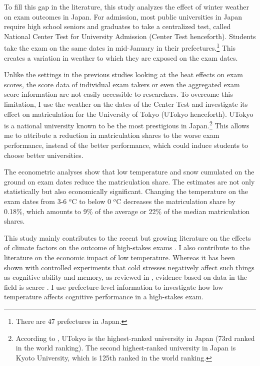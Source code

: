 \documentclass[12pt,letterpaper]{article}
\begin{document}
To fill this gap in the literature, this study analyzes the effect of winter weather on exam outcomes in Japan.
For admission, most public universities in Japan require high school seniors and graduates to take a centralized test, called National Center Test for University Admission (Center Test henceforth).
Students take the exam on the same dates in mid-January in their prefectures.\footnote{
  There are 47 prefectures in Japan.
}
This creates a variation in weather to which they are exposed on the exam dates.

Unlike the settings in the previous studies looking at the heat effects on exam scores, the score data of individual exam takers or even the aggregated exam score information are not easily accessible to researchers.
To overcome this limitation, I use the weather on the dates of the Center Test and investigate its effect on matriculation for the University of Tokyo (UTokyo henceforth).
UTokyo is a national university known to be the most prestigious in Japan.\footnote{
  According to \citet{usnews}, UTokyo is the highest-ranked university in Japan (73rd ranked in the world ranking).
  The second highest-ranked university in Japan is Kyoto University, which is 125th ranked in the world ranking.
}
This allows me to attribute a reduction in matriculation shares to the worse exam performance, instead of the better performance, which could induce students to choose better universities.

The econometric analyses show that low temperature and snow cumulated on the ground on exam dates reduce the matriculation share.
The estimates are not only statistically but also economically significant.
Changing the temperature on the exam dates from 3-6 $^o$C to below 0 $^o$C decreases the matriculation share by 0.18\%, which amounts to 9\% of the average or 22\% of the median matriculation shares.

This study mainly contributes to the recent but growing literature on the effects of climate factors on the outcome of high-stakes exams \citep{Park2020b, Cho2017}.
I also contribute to the literature on the economic impact of low temperature.
Whereas it has been shown with controlled experiments that cold stresses negatively affect such things as cognitive ability and memory, as reviewed in \citet{Taylor2016}, evidence based on data in the field is scarce \citep{Burke2015, Stevens2017}.
I use prefecture-level information to investigate how low temperature affects cognitive performance in a high-stakes exam.
\end{document}
